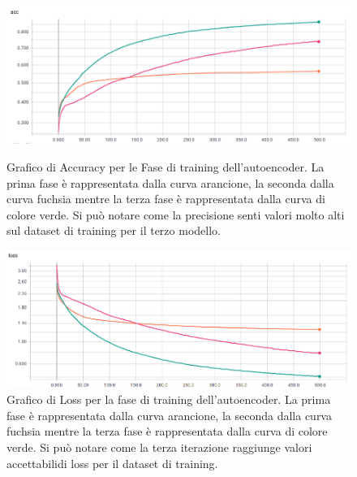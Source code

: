 \begin{figure}[!htbp]
    \centering
    \includegraphics[width=\columnwidth]{figures/autoenc.png}
    \caption{Grafico di Accuracy per le Fase di training dell'autoencoder. La prima fase è rappresentata dalla curva arancione, la seconda dalla curva fuchsia mentre la terza fase è rappresentata dalla curva di colore verde. Si può notare come la precisione senti valori molto alti sul dataset di training per il terzo modello. \label{fig:aut1}}
    \centering
    \includegraphics[width=\columnwidth]{figures/autoenc2.png}
    \caption{Grafico di Loss per la fase di training dell'autoencoder. La prima fase è rappresentata dalla curva arancione, la seconda dalla curva fuchsia mentre la terza fase è rappresentata dalla curva di colore verde. Si può notare come la terza iterazione raggiunge valori accettabilidi loss per il dataset di training.\label{fig:aut2}}
    
\end{figure}
